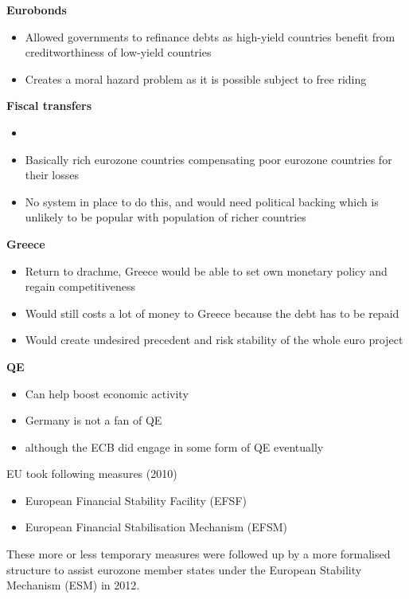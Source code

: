 \documentclass{beamer}
\begin{document}
\begin{frame}
  \textbf{Eurobonds}
  \begin{itemize}
    \item Allowed governments to refinance debts as high-yield countries benefit from creditworthiness of low-yield countries
    \item Creates a moral hazard problem as it is possible subject to free riding
  \end{itemize}
  \textbf{Fiscal transfers}
  \begin{itemize}
    \item \item Basically rich eurozone countries compensating poor eurozone countries for their losses
    \item No system in place to do this, and would need political backing which is unlikely to be popular with population of richer countries
  \end{itemize}
\end{frame}

\begin{frame}
  \textbf{Greece}
  \begin{itemize}
    \item Return to drachme, Greece would be able to set own monetary policy and regain competitiveness
    \item Would still costs a lot of money to Greece because the debt has to be repaid
    \item Would create undesired precedent and risk stability of the whole euro project
  \end{itemize}
  \textbf{QE}
  \begin{itemize}
    \item Can help boost economic activity
    \item Germany is not a fan of QE 
    \item although the ECB did engage in some form of QE eventually
  \end{itemize}
\end{frame}

\begin{frame}
  EU took following measures (2010)
  \begin{itemize}
    \item European Financial Stability Facility (EFSF) 
    \item European Financial Stabilisation Mechanism (EFSM) 
  \end{itemize}
  These more or less temporary measures were followed up by a more formalised structure to assist eurozone member states under the European Stability Mechanism (ESM) in 2012.
\end{frame}
\end{document}

